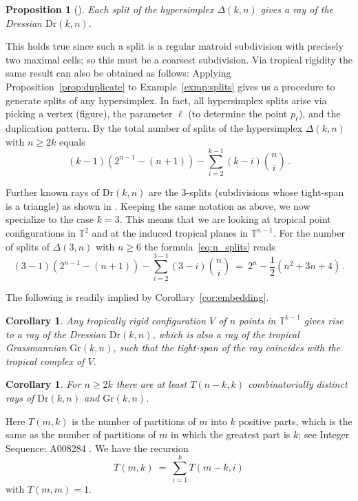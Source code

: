\documentclass[11pt,a4paper]{amsart}
\newcommand{\Hypersimplex}[2]{{\Delta(#1,#2)}}
\newcommand{\TT}{{\mathbb{T}}}
\newcommand{\Gr}[2]{{\mathrm{Gr}(#1,#2)}}
\newcommand{\Dr}[2]{{\mathrm{Dr}(#1,#2)}}
\theoremstyle{plain}
\newtheorem{proposition}[theorem]{Proposition}
\newtheorem{corollary}[theorem]{Corollary}
\theoremstyle{definition}
\begin{document}
\begin{proposition}[{\cite[Prop.~3.4]{MR2515769}}]
  Each split of the hypersimplex $\Delta(k,n)$ gives a ray of the Dressian $\Dr kn$.
\end{proposition}

This holds true since such a split is a regular matroid subdivision with precisely two maximal
cells; so this must be a coarsest subdivision.  Via tropical rigidity the same result can also be
obtained as follows: Applying Proposition~\ref{prop:duplicate} to Example~\ref{exmp:splits} gives us
a procedure to generate splits of any hypersimplex.  In fact, all hypersimplex splits arise via
picking a vertex (figure), the parameter $\ell$ (to determine the point $p_\ell$), and the
duplication pattern.  By \cite[Thm.~5.3]{MR2502496} the total number of 
splits of the hypersimplex $\Hypersimplex{k}{n}$ with $n\ge 2k$ equals
\begin{equation}
  \label{eq:n_splits}
  (k-1) \left(2^{n-1}-(n+1)\right)-\sum_{i=2}^{k-1}(k-i)\binom{n}{i} \, .
\end{equation}

Further known rays of $\Dr kn$ are the $3$-splits (subdivisions whose tight-span is a triangle) as
shown in \cite[Thm.~6.5]{Herrmann09}. Keeping the same notation as above, we now specialize to the
case $k=3$.  This means that we are looking at tropical point configurations in $\TT^2$ and at the
induced tropical planes in $\TT^{n-1}$.  For the number of splits of $\Delta(3,n)$ with $n\ge 6$ the
formula~\eqref{eq:n_splits} reads
\[
  (3-1) \left(2^{n-1}-(n+1)\right)-\sum_{i=2}^{3-1}(3-i)\binom{n}{i} \ = \
  2^n - \frac{1}{2} \left(n^2+3n+4\right) \, .
\]

The following is readily implied by Corollary~\ref{cor:embedding}.

\begin{corollary}\label{cor:trop-rigid-ray}
  Any tropically rigid configuration $V$ of $n$ points in $\TT^{k-1}$ gives rise to a ray of the
  Dressian $\Dr kn$, which is also a ray of the tropical Grassmannian $\Gr kn$, such that the
  tight-span of the ray coincides with the tropical complex of $V$.
\end{corollary}


\begin{corollary}\label{cor:trop-rigid}
  For $n\ge 2k$ there are at least $T(n-k,k)$ combinatorially distinct rays of $\Dr kn$ and $\Gr kn$.
\end{corollary}
Here $T(m,k)$ is the number of partitions of $m$ into $k$ positive parts, which is the same as the
number of partitions of $m$ in which the greatest part is $k$; see Integer Sequence: A008284 \cite{IntSeq}. We
have the recursion
\[
T(m, k) \ = \ \sum_{i=1}^k T(m-k, i)
\]
with $T(m, m)=1$.
\end{document}
